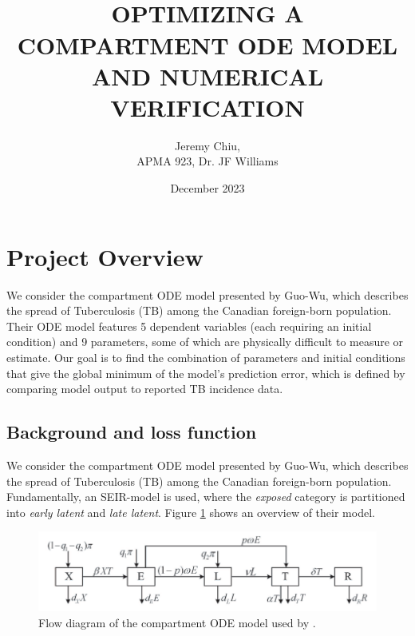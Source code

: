 \documentclass{article}
\begin{document}
\title{ \normalsize \textsc{}
	\\ [2.0cm]
	\Large \textbf{\uppercase{Optimizing a Compartment ODE Model and Numerical Verification}
	}
}

\date{December 2023}
\author{Jeremy Chiu,\\APMA 923, Dr. JF Williams} 
	

\maketitle

\section{Project Overview}

We consider the compartment ODE model presented by Guo-Wu\cite{GuoWu}, which describes the spread of Tuberculosis (TB) among the Canadian foreign-born population.  Their ODE model features 5 dependent variables (each requiring an initial condition) and 9 parameters, some of which are physically difficult to measure or estimate.  Our goal is to find the combination of parameters and initial conditions that give the global minimum of the model's prediction error, which is defined by comparing model output to reported TB incidence data.

\subsection{Background and loss function}


We consider the compartment ODE model presented by Guo-Wu\cite{GuoWu}, which describes the spread of Tuberculosis (TB) among the Canadian foreign-born population.  Fundamentally, an SEIR-model is used, where the \textit{exposed} category is partitioned into \textit{early latent} and \textit{late latent}.  Figure \ref{fig:flow} shows an overview of their model.

\begin{figure}
	\centering 
		\includegraphics[scale=0.4]{xeltr flow diagram}
		\caption{Flow diagram of the compartment ODE model used by \cite{GuoWu}.}
		\label{fig:flow}
\end{figure}
\end{document}
